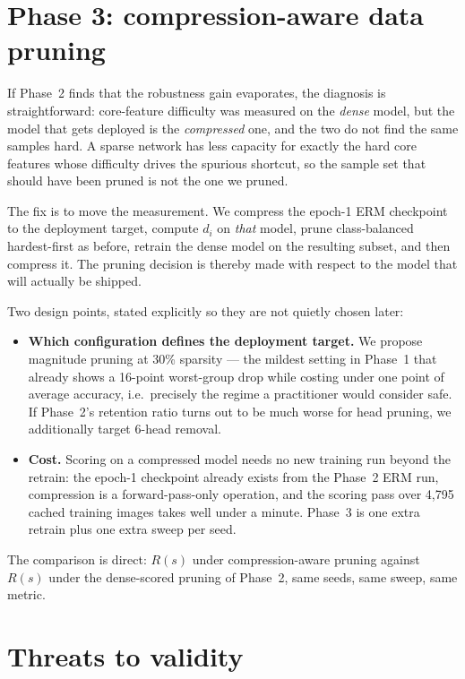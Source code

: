 \documentclass[11pt]{article}
\begin{document}
\section{Phase 3: compression-aware data pruning}

If Phase~2 finds that the robustness gain evaporates, the diagnosis is
straightforward: core-feature difficulty was measured on the \emph{dense} model,
but the model that gets deployed is the \emph{compressed} one, and the two do not
find the same samples hard. A sparse network has less capacity for exactly the
hard core features whose difficulty drives the spurious shortcut, so the sample
set that should have been pruned is not the one we pruned.

The fix is to move the measurement. We compress the epoch-1 ERM checkpoint to the
deployment target, compute $d_i$ on \emph{that} model, prune class-balanced
hardest-first as before, retrain the dense model on the resulting subset, and
then compress it. The pruning decision is thereby made with respect to the model
that will actually be shipped.

Two design points, stated explicitly so they are not quietly chosen later:

\begin{itemize}
\item \textbf{Which configuration defines the deployment target.} We propose
magnitude pruning at 30\% sparsity --- the mildest setting in Phase~1 that
already shows a 16-point worst-group drop while costing under one point of
average accuracy, i.e.\ precisely the regime a practitioner would consider safe.
If Phase~2's retention ratio turns out to be much worse for head pruning, we
additionally target 6-head removal.
\item \textbf{Cost.} Scoring on a compressed model needs no new training run
beyond the retrain: the epoch-1 checkpoint already exists from the Phase~2 ERM
run, compression is a forward-pass-only operation, and the scoring pass over
4{,}795 cached training images takes well under a minute. Phase~3 is one extra
retrain plus one extra sweep per seed.
\end{itemize}

The comparison is direct: $R(s)$ under compression-aware pruning against $R(s)$
under the dense-scored pruning of Phase~2, same seeds, same sweep, same metric.

\section{Threats to validity}
\end{document}
